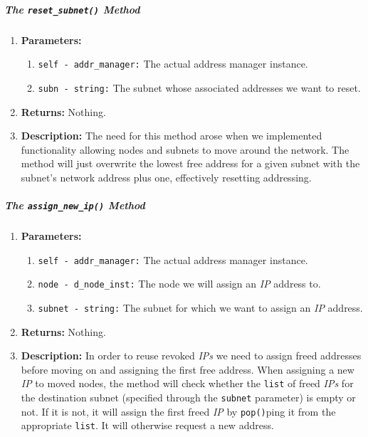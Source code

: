         \subparagraph{The \texttt{reset\_subnet()} Method}
            \begin{enumerate}
                \item \textbf{Parameters:}
                \begin{enumerate}
                    \item \texttt{self - addr\_manager:} The actual address manager instance.
                    \item \texttt{subn - string:} The subnet whose associated addresses we want to reset.
                \end{enumerate}
                \item \textbf{Returns:} Nothing.
                \item \textbf{Description:} The need for this method arose when we implemented functionality allowing nodes and subnets to move around the network. The method will just overwrite the lowest free address for a given subnet with the subnet's network address plus one, effectively resetting addressing.
            \end{enumerate}

        \subparagraph{The \texttt{assign\_new\_ip()} Method}
            \begin{enumerate}
                \item \textbf{Parameters:}
                \begin{enumerate}
                    \item \texttt{self - addr\_manager:} The actual address manager instance.
                    \item \texttt{node - d\_node\_inst:} The node we will assign an \textit{IP} address to.
                    \item \texttt{subnet - string:} The subnet for which we want to assign an \textit{IP} address.
                \end{enumerate}
                \item \textbf{Returns:} Nothing.
                \item \textbf{Description:} In order to reuse revoked \textit{IPs} we need to assign freed addresses before moving on and assigning the first free address. When assigning a new \textit{IP} to moved nodes, the method will check whether the \texttt{list} of freed \textit{IPs} for the destination subnet (specified through the \texttt{subnet} parameter) is empty or not. If it is not, it will assign the first freed \textit{IP} by \texttt{pop()}ping \cite{bib:python-datastructures} it from the appropriate \texttt{list}. It will otherwise request a new address.
            \end{enumerate}
